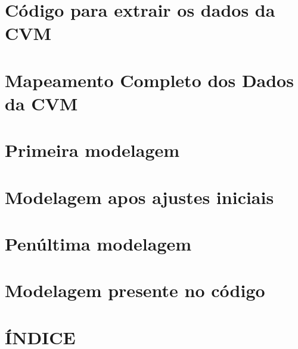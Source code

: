 \documentclass[recuosum=1.5cm]{iftex2024}
\newcounter{codigo}[chapter]
\begin{document}
\chapter{Código para extrair os dados da CVM}
\label{ap:codigo-extrair}


\chapter{Mapeamento Completo dos Dados da CVM}
\label{ap:mapeamento-cvm-dfp}


\chapter{Primeira modelagem}
\label{ap:esquema-inicial}


\chapter{Modelagem apos ajustes iniciais}
\label{ap:esquema-algumas-modelagens}


\chapter{Penúltima modelagem}
\label{ap:esquema-penultima-modelagem}


\chapter{Modelagem presente no código}
\label{ap:esquema-logico-ultimo-presente-no-codigo}


\chapter*{ÍNDICE}

\printindex
\end{document}

